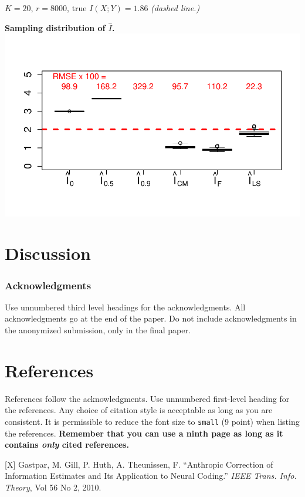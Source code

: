 \documentclass{article}
\begin{document}
$K=20$, $r = 8000$, true $I(X; Y) = 1.86$ \emph{(dashed line.)}

\begin{center}
\textbf{Sampling distribution of $\hat{I}$.}
\includegraphics[scale = 0.6, clip = true, trim = 0 0.5in 0 0.5in]{../info_theory_sims/fig6.pdf}
\end{center}

\section{Discussion}

\subsubsection*{Acknowledgments}

Use unnumbered third level headings for the acknowledgments. All
acknowledgments go at the end of the paper. Do not include
acknowledgments in the anonymized submission, only in the final paper.

\section*{References}

References follow the acknowledgments. Use unnumbered first-level
heading for the references. Any choice of citation style is acceptable
as long as you are consistent. It is permissible to reduce the font
size to \verb+small+ (9 point) when listing the references. {\bf
  Remember that you can use a ninth page as long as it contains
  \emph{only} cited references.}
\medskip

\small

[X] Gastpar, M.  Gill, P.  Huth, A.  Theunissen, F. ``Anthropic Correction of Information Estimates and Its Application to Neural Coding.'' \emph{IEEE Trans. Info. Theory}, Vol 56 No 2, 2010.
\end{document}
